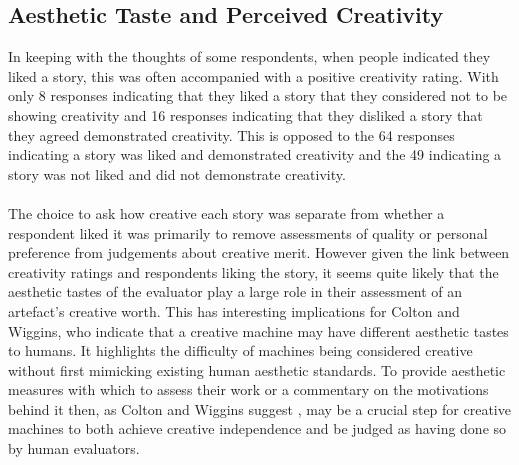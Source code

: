 \documentclass[letterpaper]{article}
\begin{document}
\subsection{Aesthetic Taste and Perceived Creativity} \label{sec:aesthetics}
In keeping with the thoughts of some respondents, when people indicated they liked a story, this was often accompanied with a positive creativity rating. With only 8 responses indicating that they liked a story that they considered not to be showing creativity and 16 responses indicating that they disliked a story that they agreed demonstrated creativity. This is opposed to the 64 responses indicating a story was liked and demonstrated creativity and the 49 indicating a story was not liked and did not demonstrate creativity.\\
\\The choice to ask how creative each story was separate from whether a respondent liked it was primarily to remove assessments of quality or personal preference from judgements about creative merit. However given the link between creativity ratings and respondents liking the story, it seems quite likely that the aesthetic tastes of the evaluator play a large role in their assessment of an artefact's creative worth. This has interesting implications for Colton and Wiggins, who indicate that a creative machine may have different aesthetic tastes to humans. It highlights the difficulty of machines being considered creative without first mimicking existing human aesthetic standards. To provide aesthetic measures with which to assess their work or a commentary on the motivations behind it then, as Colton and Wiggins suggest \cite{Colton_computationalcreativity}, may be a crucial step for creative machines to both achieve creative independence and be judged as having done so by human evaluators.

\end{document}
